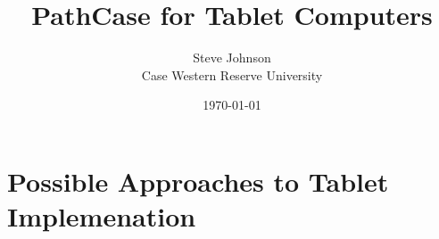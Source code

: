 \documentclass[12pt]{article}
\title{PathCase for Tablet Computers}
\author{Steve Johnson\\
        Case Western Reserve University\\
}
\date{\today}
\begin{document}
\doublespacing

\maketitle



\section{Possible Approaches to Tablet Implemenation}












\nocite{*}


\end{document}

